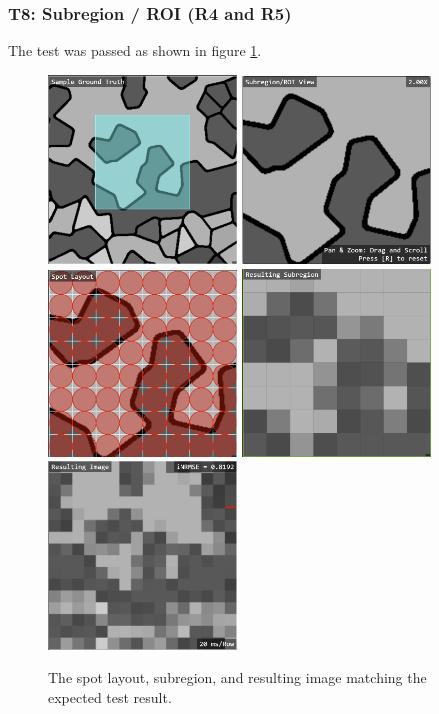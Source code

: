 \documentclass[12pt, titlepage]{article}
\begin{document}
\subsubsection{T8: Subregion / ROI (R4 and R5)}
The test was passed as shown in figure \ref{fig_t8}.
\begin{figure}[h!]
  \begin{center}
   \includegraphics[width=5cm]{t8a.png}
   \includegraphics[width=5cm]{t8b.png}
   \includegraphics[width=5cm]{t8c.png}
   \includegraphics[width=5cm]{t8d.png}
   \includegraphics[width=5cm]{t8e.png}
  \caption{The spot layout, subregion, and resulting image matching the expected test result.}
  \label{fig_t8} 
  \end{center}
\end{figure}
\end{document}
